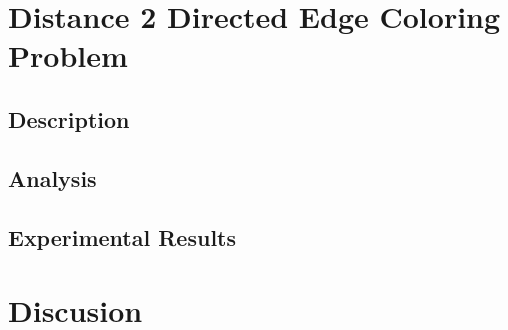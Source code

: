 \documentclass[twoside]{article}
\begin{document}
\section{Distance 2 Directed Edge Coloring Problem}
\subsection{Description}




\subsection{Analysis}

\subsection{Experimental Results}
\label{sub:experiment-erdren-direct}

\section{Discusion}



\end{document}
